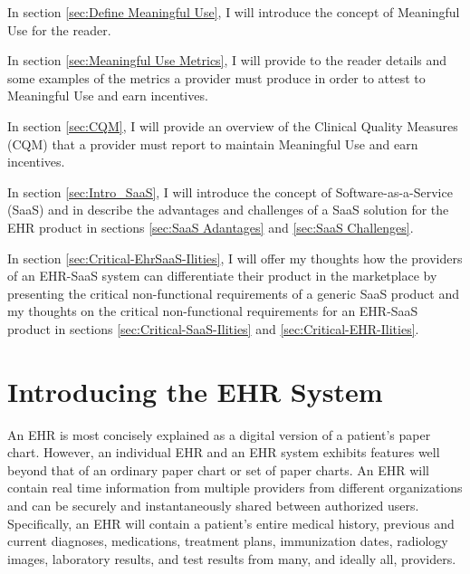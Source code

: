 \documentclass[10pt]{article}
\begin{document}
In section \ref{sec:Define Meaningful Use}, I will introduce the concept of Meaningful Use for the reader.

In section \ref{sec:Meaningful Use Metrics}, I will provide to the reader details and some examples of the metrics a provider must produce in order to attest to Meaningful Use and earn incentives.

In section \ref{sec:CQM}, I will provide an overview of the Clinical Quality Measures (CQM) that a provider must report to maintain Meaningful Use and earn incentives.

In section \ref{sec:Intro_SaaS}, I will introduce the concept of Software-as-a-Service (SaaS) and in describe the advantages and challenges of a SaaS solution for the EHR product in sections \ref{sec:SaaS Adantages} and \ref{sec:SaaS Challenges}.
 
In section \ref{sec:Critical-EhrSaaS-Ilities}, I will offer my thoughts how the providers of an EHR-SaaS system can differentiate their product in the marketplace by presenting the critical non-functional requirements of a generic SaaS product and my thoughts on the critical non-functional requirements for an EHR-SaaS product in sections \ref{sec:Critical-SaaS-Ilities} and \ref{sec:Critical-EHR-Ilities}. 

\section{Introducing the EHR System}
\label{sec:Intro_EHR}

An EHR is most concisely explained as a digital version of a patient's paper chart.
However, an individual EHR and an EHR system exhibits features well beyond that of an ordinary paper chart or set of paper charts.
An EHR will contain real time information from multiple providers from different organizations and can be securely and instantaneously shared between authorized users.
Specifically, an EHR will contain a patient's entire medical history, previous and current diagnoses, medications, treatment plans, immunization dates, radiology images, laboratory results, and test results from many, and ideally all, providers.
\end{document}
